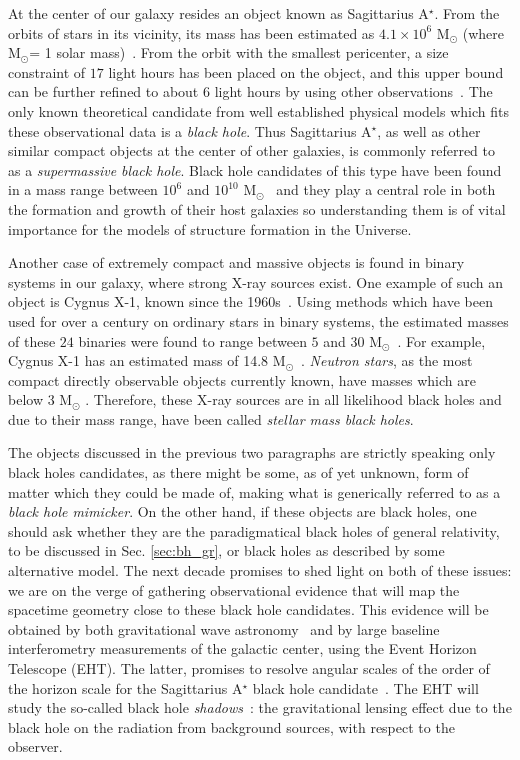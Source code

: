 At the center of our galaxy resides an object known as Sagittarius A$^\star$.
From the orbits of stars in its vicinity, its mass has been estimated as $4.1\times 10^6$ M$_\odot$ (where M$_\odot$= 1 solar mass)~\cite{Ghez:2008ms}.
From the orbit with the smallest pericenter, a size constraint of $17$ light hours has been placed on the object, and this upper bound can be further refined to about $6$ light hours by using other observations~\cite{Ghez:2003qj}.
The only known theoretical candidate from well established physical models which fits these observational data is a \textit{black hole}.
Thus Sagittarius A$^\star$, as well as other similar compact objects at the center of other galaxies, is commonly referred to as a \emph{supermassive black hole}.
Black hole candidates of this type have been found in a mass range between $10^6$ and $10^{10}$ M$_\odot$~\cite{Narayan:2013gca} and they play a central role in both the formation and growth of their host galaxies \cite{Kormendy:2013pja} so understanding them is of vital importance for the models of structure formation in the Universe.

Another case of extremely compact and massive objects is found in binary systems in our galaxy, where strong X-ray sources exist.
One example of such an object is Cygnus X-1, known since the 1960s~\cite{1965Sci...147..394B}.
Using methods which have been used for over a century on ordinary stars in binary systems, the estimated masses of these $24$ binaries were found to range between $5$ and $30$ M$_\odot$~\cite{Narayan:2013gca}.
For example, Cygnus X-1 has an estimated mass of 14.8 M$_\odot$~\cite{Reid:2011nn}.
\textit{Neutron stars}, as the most compact directly observable objects currently known, have masses which are below $3$ M$_\odot$ \cite{Kalogera:1996ci,Rhoades:1974fn}.
Therefore, these X-ray sources are in all likelihood black holes and due to their mass range, have been called \textit{stellar mass black holes}.

The objects discussed in the previous two paragraphs are strictly speaking only black holes candidates, 
as there might be some, as of yet unknown, form of matter which they could be made of, making what is generically referred to as a \textit{black hole mimicker}.
On the other hand, if these objects are black holes, one should ask whether they are the paradigmatical black holes of general relativity, to be discussed in Sec. \ref{sec:bh_gr}, or black holes as described by some alternative model.
The next decade promises to shed light on both of these issues: we are on the verge of gathering observational evidence that will map the spacetime geometry close to these black hole candidates.
This evidence will be obtained by both gravitational wave astronomy~\cite{Hild:2011np,Hobbs:2009yy,Seoane:2013qna} and by large baseline interferometry measurements of the galactic center, using the Event Horizon Telescope (EHT).
The latter, promises to resolve angular scales of the order of the horizon scale for the Sagittarius A$^\star$ black hole candidate~\cite{Loeb:2013lfa}.
The EHT will study the so-called black hole \textit{shadows}~\cite{Falcke:1999pj}: the gravitational lensing effect due to the black hole on the radiation from background sources, with respect to the observer.

